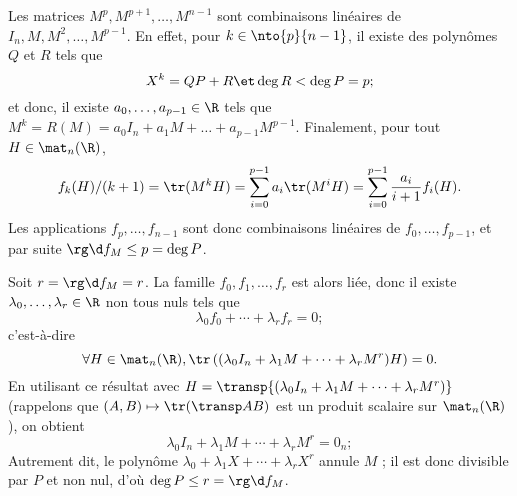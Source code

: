 \begin{enonce}
\begin{solution}
\begin{enumerate}
    Les matrices $M^p, M^{p+1},\dotsc,M^{n-1}$ sont combinaisons linéaires de $I_n,M,M^2,\dotsc,M^{p-1}$. En effet, pour $k\in\nto{p}{n-1}$, il existe des polynômes $Q$ et $R$ tels que
\begin{equation*}
    X^k = Q P+ R \et \deg R<\deg P=p ;
\end{equation*}
et donc, il existe $a_0,\dotsc,a_{p-1}\in\R$ tels que $M^k=R(M)=a_0I_n+a_1M+\dotso+a_{p-1}M^{p-1}$.
Finalement, pour tout $H\in\mat_n(\R)$, 
\begin{equation*}
f_k(H)/(k+1)=\tr(M^kH)=\sum_{i=0}^{p-1} a_i\tr(M^iH)=\sum_{i=0}^{p-1} \frac{a_i}{i+1}f_i(H).
\end{equation*}
Les applications $f_{p},\dotsc,f_{n-1}$ sont donc combinaisons linéaires de $f_0,\dotsc,f_{p-1}$, et par suite $\rg \d f_M\leq p=\deg P$.

Soit $r=\rg \d f_M=r$.
La famille $f_0,f_1,\dotsc,f_r$ est alors liée, donc il existe $\lambda_0,\dotsc,\lambda_r\in\R$ non tous nuls tels que
\begin{equation*}
\lambda_0 f_0+\dotsm+\lambda_rf_r=0 ;
\end{equation*}
c'est-à-dire 
\begin{equation*}
\forall H\in\mat_n(\R), \tr\left( (\lambda_0 I_n+\lambda_1M+\dotsm+\lambda_r M^r) H\right) = 0.
\end{equation*}
En utilisant ce résultat avec $H=\transp{(\lambda_0 I_n+\lambda_1M+\dotsm+\lambda_r M^r)}$ (rappelons que $(A,B)\mapsto\tr(\transp AB)$ est un produit scalaire sur $\mat_n(\R)$), on obtient
\begin{equation*}
    \lambda_0 I_n+\lambda_1M+\dotsm+\lambda_r M^r=0_n ;
\end{equation*}
Autrement dit, le polynôme $\lambda_0+\lambda_1X+\dotsm+\lambda_rX^r$ annule $M$ ;
il est donc divisible par $P$ et non nul, d'où $\deg P\leq r =\rg \d f_M$.
\end{enumerate}
\end{solution}
\end{enonce}

